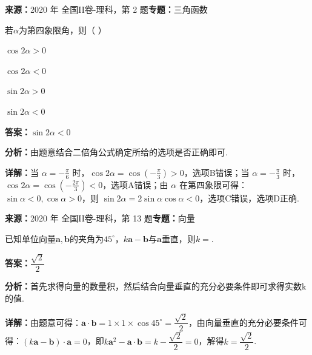 \begin{question}[points=5]
\textbf{来源：}2020 年 全国II卷-理科，第 2 题\quad \textbf{专题：}三角函数\par
若$\alpha$为第四象限角，则（ ）
\begin{choices}
  \item $\cos2\alpha>0$
  \item $\cos2\alpha<0$
  \item $\sin2\alpha>0$
  \item $\sin2\alpha<0$
\end{choices}
\begin{solution}
\textbf{答案：}$\sin2\alpha<0$

\textbf{分析：}由题意结合二倍角公式确定所给的选项是否正确即可.

\textbf{详解：}当 $\alpha=-\frac{\pi}{6}$ 时，$\cos2\alpha=\cos\left(-\frac{\pi}{3}\right)>0$，选项B错误；当 $\alpha=-\frac{\pi}{3}$ 时，$\cos2\alpha=\cos\left(-\frac{2\pi}{3}\right)<0$，选项A错误；由 $\alpha$ 在第四象限可得：$\sin\alpha<0,\cos\alpha>0$，则 $\sin2\alpha=2\sin\alpha\cos\alpha<0$，选项C错误，选项D正确.
\end{solution}
\end{question}

\begin{question}[points=5]
\textbf{来源：}2020 年 全国II卷-理科，第 13 题\quad \textbf{专题：}向量\par
已知单位向量$\boldsymbol{a},\boldsymbol{b}$的夹角为$45^\circ$，$k\boldsymbol{a}-\boldsymbol{b}$与$\boldsymbol{a}$垂直，则$k=$.
\begin{solution}
\textbf{答案：}$\dfrac{\sqrt2}{2}$

\textbf{分析：}首先求得向量的数量积，然后结合向量垂直的充分必要条件即可求得实数k的值.

\textbf{详解：}由题意可得：$\boldsymbol{a}\cdot\boldsymbol{b}=1\times1\times\cos45^\circ=\dfrac{\sqrt2}{2}$，由向量垂直的充分必要条件可得：$(k\boldsymbol{a}-\boldsymbol{b})\cdot\boldsymbol{a}=0$，即$k\boldsymbol{a}^2-\boldsymbol{a}\cdot\boldsymbol{b}=k-\dfrac{\sqrt2}{2}=0$，解得$k=\dfrac{\sqrt2}{2}$.
\end{solution}
\end{question}


